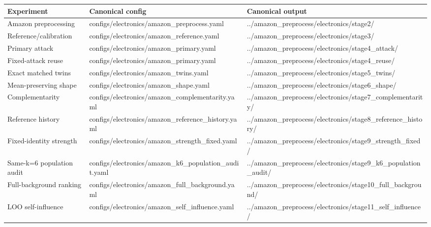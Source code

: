 \begin{tabular}{lll}
\toprule
Experiment & Canonical config & Canonical output \\
\midrule
Amazon preprocessing & configs/electronics/amazon_preprocess.yaml & ../amazon_preprocess/electronics/stage2/ \\
Reference/calibration & configs/electronics/amazon_reference.yaml & ../amazon_preprocess/electronics/stage3/ \\
Primary attack & configs/electronics/amazon_primary.yaml & ../amazon_preprocess/electronics/stage4_attack/ \\
Fixed-attack reuse & configs/electronics/amazon_primary.yaml & ../amazon_preprocess/electronics/stage4_reuse/ \\
Exact matched twins & configs/electronics/amazon_twins.yaml & ../amazon_preprocess/electronics/stage5_twins/ \\
Mean-preserving shape & configs/electronics/amazon_shape.yaml & ../amazon_preprocess/electronics/stage6_shape/ \\
Complementarity & configs/electronics/amazon_complementarity.yaml & ../amazon_preprocess/electronics/stage7_complementarity/ \\
Reference history & configs/electronics/amazon_reference_history.yaml & ../amazon_preprocess/electronics/stage8_reference_history/ \\
Fixed-identity strength & configs/electronics/amazon_strength_fixed.yaml & ../amazon_preprocess/electronics/stage9_strength_fixed/ \\
Same-k=6 population audit & configs/electronics/amazon_k6_population_audit.yaml & ../amazon_preprocess/electronics/stage9_k6_population_audit/ \\
Full-background ranking & configs/electronics/amazon_full_background.yaml & ../amazon_preprocess/electronics/stage10_full_background/ \\
LOO self-influence & configs/electronics/amazon_self_influence.yaml & ../amazon_preprocess/electronics/stage11_self_influence/ \\
\bottomrule
\end{tabular}
